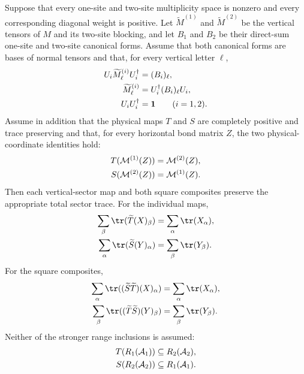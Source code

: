 \begin{lemma}
    \label{thm:mpdo_transported_vertical_sector_composites_trace_preserving}
    \leanok
    Suppose that every one-site and two-site multiplicity space is nonzero
    and every corresponding diagonal weight is positive. Let
    $\widetilde M^{(1)}$ and $\widetilde M^{(2)}$ be the vertical tensors of
    $M$ and its two-site blocking, and let $B_1$ and $B_2$ be their direct-sum
    one-site and two-site canonical forms. Assume that both canonical forms
    are bases of normal tensors and that, for every vertical letter $\ell$,
    \begin{align}
        U_i\widetilde M^{(i)}_\ell U_i^\dagger & =(B_i)_\ell,
        \notag                                                               \\
        \widetilde M^{(i)}_\ell                & =U_i^\dagger(B_i)_\ell U_i,
        \notag                                                               \\
        U_iU_i^\dagger                         & =\mathbf 1
        \qquad (i=1,2).
        \notag
    \end{align}
    Assume in addition that the physical maps $T$ and $S$ are completely
    positive and trace preserving and that, for every horizontal bond matrix
    $Z$, the two physical-coordinate identities hold:
    \begin{align}
        T(\mathcal M^{(1)}(Z)) & =\mathcal M^{(2)}(Z),
        \notag                                         \\
        S(\mathcal M^{(2)}(Z)) & =\mathcal M^{(1)}(Z).
        \notag
    \end{align}
    Then each vertical-sector map and both square composites preserve the
    appropriate total sector trace. For the individual maps,
    \begin{align}
        \sum_\beta\tr(\widetilde T(X)_\beta)
         & =\sum_\alpha\tr(X_\alpha),
        \notag                        \\
        \sum_\alpha\tr(\widetilde S(Y)_\alpha)
         & =\sum_\beta\tr(Y_\beta).
        \notag
    \end{align}
    For the square composites,
    \begin{align}
        \sum_\alpha\tr
        ((\widetilde S\widetilde T)(X)_\alpha)
         & =\sum_\alpha\tr(X_\alpha),
        \notag                        \\
        \sum_\beta\tr
        ((\widetilde T\widetilde S)(Y)_\beta)
         & =\sum_\beta\tr(Y_\beta).
        \notag
    \end{align}
    Neither of the stronger range inclusions is assumed:
    \begin{align}
        T(R_1(\mathcal A_1)) & \subseteq R_2(\mathcal A_2),
        \notag                                              \\
        S(R_2(\mathcal A_2)) & \subseteq R_1(\mathcal A_1).
        \notag
    \end{align}
\end{lemma}

